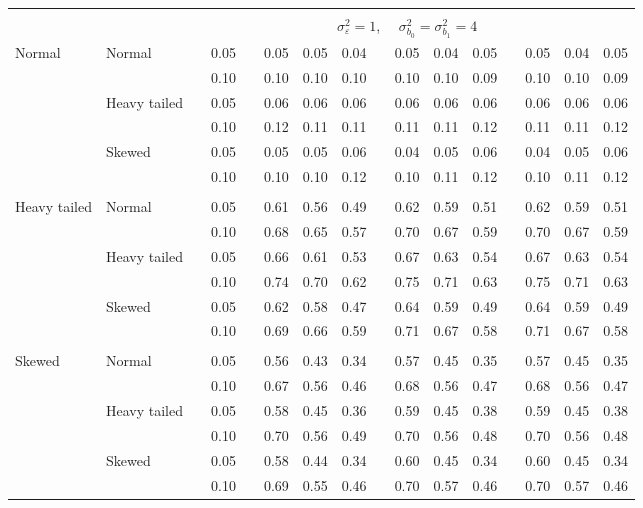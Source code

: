 \documentclass{article} %
\begin{document}
\begin{table}[ht]
\begin{scriptsize}
\begin{center}
\begin{tabular}{ll p{.1cm} c p{.1cm} rrr p{.1cm} rrr p{.1cm} rrr}
&&&&&&&&&&&&&&&\\
& && && \multicolumn{9}{c}{$\sigma_{\varepsilon}^2 = 1$, \ \ $\sigma_{b_0}^2 = \sigma_{b_1}^2 = 4$} \\ \cline{6-16}
\rowcolor{gray!20}Normal       & Normal       && 0.05 &&   0.05 & 0.05 & 0.04 && 0.05 & 0.04 & 0.05 && 0.05 & 0.04 & 0.05 \\ 
\rowcolor{gray!20}             &              && 0.10 &&   0.10 & 0.10 & 0.10 && 0.10 & 0.10 & 0.09 && 0.10 & 0.10 & 0.09 \\ 
\rowcolor{gray!20}             & Heavy tailed && 0.05 &&   0.06 & 0.06 & 0.06 && 0.06 & 0.06 & 0.06 && 0.06 & 0.06 & 0.06 \\ 
\rowcolor{gray!20}             &              && 0.10 &&   0.12 & 0.11 & 0.11 && 0.11 & 0.11 & 0.12 && 0.11 & 0.11 & 0.12 \\ 
\rowcolor{gray!20}             & Skewed       && 0.05 &&   0.05 & 0.05 & 0.06 && 0.04 & 0.05 & 0.06 && 0.04 & 0.05 & 0.06 \\ 
\rowcolor{gray!20}             &              && 0.10 &&   0.10 & 0.10 & 0.12 && 0.10 & 0.11 & 0.12 && 0.10 & 0.11 & 0.12 \\ 
             &&&&&&&&&&&&&&&\\
Heavy tailed & Normal       && 0.05 &&   0.61 & 0.56 & 0.49 && 0.62 & 0.59 & 0.51 && 0.62 & 0.59 & 0.51 \\ 
             &              && 0.10 &&   0.68 & 0.65 & 0.57 && 0.70 & 0.67 & 0.59 && 0.70 & 0.67 & 0.59 \\ 
             & Heavy tailed && 0.05 &&   0.66 & 0.61 & 0.53 && 0.67 & 0.63 & 0.54 && 0.67 & 0.63 & 0.54 \\ 
             &              && 0.10 &&   0.74 & 0.70 & 0.62 && 0.75 & 0.71 & 0.63 && 0.75 & 0.71 & 0.63 \\ 
             & Skewed       && 0.05 &&   0.62 & 0.58 & 0.47 && 0.64 & 0.59 & 0.49 && 0.64 & 0.59 & 0.49 \\ 
             &              && 0.10 &&   0.69 & 0.66 & 0.59 && 0.71 & 0.67 & 0.58 && 0.71 & 0.67 & 0.58 \\ 
             &&&&&&&&&&&&&&&\\
Skewed       & Normal       && 0.05 &&   0.56 & 0.43 & 0.34 && 0.57 & 0.45 & 0.35 && 0.57 & 0.45 & 0.35 \\ 
             &              && 0.10 &&   0.67 & 0.56 & 0.46 && 0.68 & 0.56 & 0.47 && 0.68 & 0.56 & 0.47 \\ 
             & Heavy tailed && 0.05 &&   0.58 & 0.45 & 0.36 && 0.59 & 0.45 & 0.38 && 0.59 & 0.45 & 0.38 \\ 
             &              && 0.10 &&   0.70 & 0.56 & 0.49 && 0.70 & 0.56 & 0.48 && 0.70 & 0.56 & 0.48 \\ 
             & Skewed       && 0.05 &&   0.58 & 0.44 & 0.34 && 0.60 & 0.45 & 0.34 && 0.60 & 0.45 & 0.34 \\ 
             &              && 0.10 &&   0.69 & 0.55 & 0.46 && 0.70 & 0.57 & 0.46 && 0.70 & 0.57 & 0.46 \\ 



\end{tabular}
\end{center}
\end{scriptsize}
\end{table}
\end{document}
